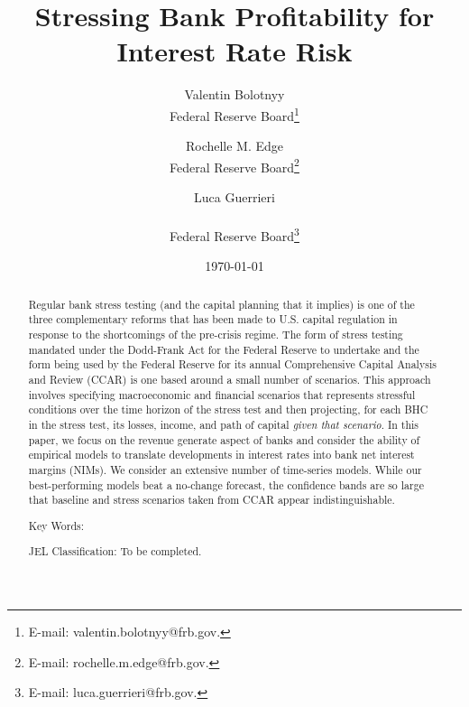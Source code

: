 \documentclass[11pt]{article}
\renewcommand{\baselinestretch}{1.5}
\begin{document}
\renewcommand{\baselinestretch}{1}
\author{{\Large Valentin Bolotnyy} \\
Federal Reserve Board\thanks{E-mail: valentin.bolotnyy@frb.gov.\vspace{0.05in}} \and
{\Large Rochelle M. Edge} \\
Federal Reserve Board\thanks{E-mail: rochelle.m.edge@frb.gov.\vspace{0.05in}}\and
{\Large Luca Guerrieri} \\
\addtocounter{footnote}{5} Federal Reserve Board\thanks{%
E-mail: luca.guerrieri@frb.gov.}}
\title{\textbf{Stressing Bank Profitability for Interest Rate Risk}}
\date{\today}
\maketitle


\begin{abstract}
\vspace{-0.06in} \noindent  Regular bank stress testing (and the capital planning that it implies) is one of the three complementary reforms that has been made to U.S. capital regulation in response to the shortcomings of the pre-crisis regime.
 The form of stress testing mandated under the Dodd-Frank Act for the Federal Reserve to undertake and the form being used by the Federal Reserve for its annual Comprehensive Capital Analysis and Review (CCAR) is one based around a small number of scenarios.  This approach involves specifying macroeconomic and financial scenarios that represents stressful conditions over the time horizon of the stress test and then projecting, for each BHC in the stress test, its losses, income, and path of capital \textit{given that scenario}. In this paper, we focus on the revenue generate aspect of banks and consider the ability of empirical models to translate developments in interest rates into bank net interest margins (NIMs). We consider an extensive number of time-series models. While our best-performing models beat a no-change forecast, the confidence bands are so large that baseline and stress scenarios taken from CCAR appear indistinguishable.


\vspace{.125in}

\noindent Key Words:

\vspace{.125in}

\noindent JEL Classification: To be completed.


\end{abstract}
\renewcommand{\baselinestretch}{1.5}
\thispagestyle{empty}
\end{document}
